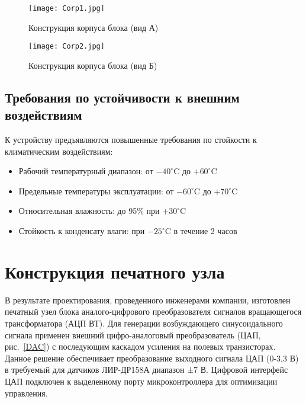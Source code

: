 \begin{figure}[htbp]
    \centering
    \begin{minipage}{0.48\linewidth}%
       \centering
        \texttt{[image: Corp1.jpg]}
        \caption{Конструкция корпуса блока (вид А)}
        \label{Corp1}
    \end{minipage}\hfill%
    \begin{minipage}{0.48\linewidth}%
       \centering
        \texttt{[image: Corp2.jpg]}
        \caption{Конструкция корпуса блока (вид Б)}
        \label{Corp2}
    \end{minipage}
\end{figure}


\FloatBarrier
\subsection{Требования по устойчивости к внешним воздействиям}
К устройству предъявляются повышенные требования по стойкости к климатическим воздействиям:
\begin{itemize}
    \item Рабочий температурный диапазон: от $-40^\circ$C до $+60^\circ$C
    \item Предельные температуры эксплуатации: от $-60^\circ$C до $+70^\circ$C
    \item Относительная влажность: до 95\% при $+30^\circ$C
    \item Стойкость к конденсату влаги: при $-25^\circ$C в течение 2 часов
\end{itemize}

\FloatBarrier
\section{Конструкция печатного узла}

В результате проектирования, проведенного инженерами компании, изготовлен печатный узел блока аналого-цифрового преобразователя сигналов вращающегося трансформатора (АЦП ВТ). 
Для генерации возбуждающего синусоидального сигнала применен внешний цифро-аналоговый преобразователь (ЦАП, рис.~\ref{DAC}) с последующим каскадом усиления 
на полевых транзисторах. Данное решение обеспечивает преобразование выходного сигнала ЦАП (0-3,3 В) в требуемый для датчиков ЛИР-ДР158А диапазон ±7 В. 
Цифровой интерфейс ЦАП подключен к выделенному порту микроконтроллера для оптимизации управления. 

